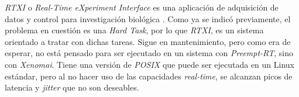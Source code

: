 
\textit{RTXI} o \textit{Real-Time eXperiment Interface} es una aplicación de adquisición de datos y control para investigación biológica \cite{RTXIOrg2025}. Como ya se indicó previamente, el problema en cuestión es una \textit{Hard Task}, por lo que \textit{RTXI}, es un sistema orientado a tratar con dichas tareas. Sigue en mantenimiento, pero como era de esperar, no está pensado para ser ejecutado en un sistema con \textit{Preempt-RT}, sino con \textit{Xenomai}. Tiene una versión de \textit{POSIX} que puede ser ejecutada en un Linux estándar, pero al no hacer uso de las capacidades \textit{real-time}, se alcanzan picos de latencia y \textit{jitter} que no son deseables.
